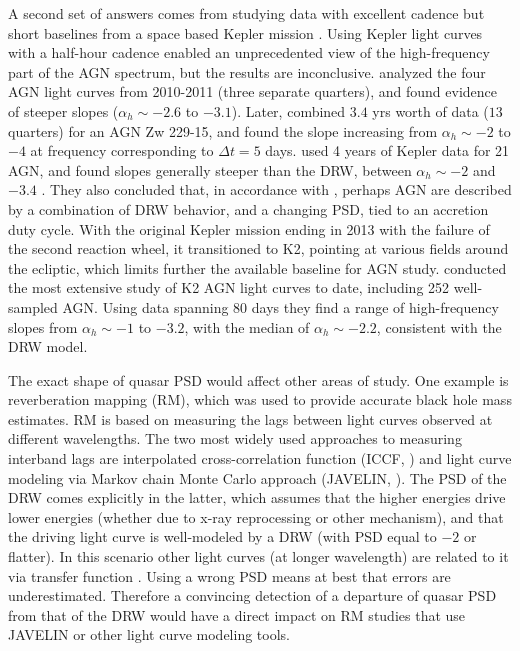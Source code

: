 \documentclass[twocolumn]{aastex62}
\begin{document}
A second set of answers comes from studying data with excellent cadence but short baselines from a space based Kepler mission \citep{borucki2010}. Using Kepler light curves   with a half-hour cadence enabled an unprecedented view of the high-frequency part of the AGN spectrum, but the results are inconclusive. \cite{mushotzky2011}  analyzed the four AGN light curves from 2010-2011 (three separate quarters), and found evidence of steeper slopes ($\alpha_{h} \sim -2.6 $ to $ -3.1$).  Later,  \cite{edelson2014} combined $3.4$ yrs worth of data ($13$ quarters)  for an AGN Zw 229-15, and found the slope increasing from $\alpha_{h} \sim -2 $ to $ -4 $ at frequency corresponding to $\Delta t = 5$ days. \cite{smith2018} used 4 years of Kepler data for 21 AGN,  and found slopes generally steeper than the DRW, between $\alpha_{h} \sim -2$ and $-3.4$ . They also concluded that, in accordance with \cite{caplar2017}, perhaps AGN are described by a combination of DRW behavior, and a changing PSD, tied to an accretion duty cycle. With the original  Kepler  mission ending in   2013 with the failure of the second reaction wheel,  it transitioned to K2, pointing at various fields around the ecliptic, which limits further the available baseline for AGN study.  \citet{aranzana2018} conducted the most extensive study of K2 AGN light curves to date, including 252 well-sampled AGN. Using data spanning 80 days they find a range of high-frequency slopes from $\alpha_{h} \sim -1$ to $-3.2$, with the median of $\alpha_{h} \sim -2.2$,  consistent with the DRW model.



The exact shape of quasar PSD would affect other areas of study. One example is reverberation mapping (RM), which was used to provide  accurate black hole mass estimates. RM is based on measuring the lags between light curves observed at different wavelengths. The two most widely used approaches to measuring interband lags are interpolated cross-correlation function (ICCF, \citealt{gaskell1987, peterson2004})  and  light curve modeling via Markov chain Monte Carlo approach (JAVELIN, \citealt{zu2011}). The PSD of the DRW comes explicitly in the latter,  which assumes that the higher energies drive lower energies (whether due to x-ray reprocessing or other mechanism), and that the driving light curve is well-modeled by a DRW (with PSD equal to  $-2$ or flatter).  In this scenario other light curves (at longer wavelength) are related to it via transfer function \cite{edelson2019}. Using a wrong PSD means at best that errors are underestimated. Therefore a convincing detection of a departure of quasar PSD from that of the DRW  would have  a direct impact on RM studies that use  JAVELIN or other light curve modeling tools. 
\end{document}
